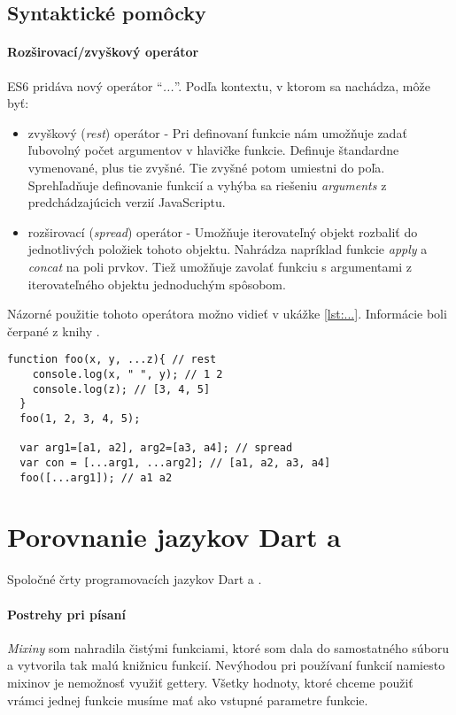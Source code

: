 \subsection{Syntaktické pomôcky}

\paragraph{Rozširovací/zvyškový operátor}
ES6 pridáva nový operátor ``\emph{...}''. Podľa kontextu, v ktorom sa nachádza, môže byť:
\begin{itemize}
  \item zvyškový (\emph{rest}) operátor - Pri definovaní funkcie nám umožňuje zadať ľubovolný počet argumentov v hlavičke funkcie. Definuje štandardne vymenované, plus tie zvyšné. Tie zvyšné potom umiestni do poľa. Sprehľadňuje definovanie funkcií a vyhýba sa riešeniu \emph{arguments} z predchádzajúcich verzií JavaScriptu.
  \item rozširovací (\emph{spread}) operátor - Umožňuje iterovateľný objekt rozbaliť do jednotlivých položiek tohoto objektu. Nahrádza napríklad funkcie \emph{apply} a \emph{concat} na poli prvkov. Tiež umožňuje zavolať funkciu s argumentami z iterovateľného objektu jednoduchým spôsobom.
\end{itemize}
Názorné použitie tohoto operátora možno vidieť v ukážke \ref{lst:...}.
Informácie boli čerpané z knihy \cite[Exploring ES6]{expES6}.

\begin{lstlisting}[caption=rozširovací/zvyškový operátor, label={lst:...}]
  function foo(x, y, ...z){ // rest
    console.log(x, " ", y); // 1 2
    console.log(z); // [3, 4, 5]
  }
  foo(1, 2, 3, 4, 5);

  var arg1=[a1, a2], arg2=[a3, a4]; // spread
  var con = [...arg1, ...arg2]; // [a1, a2, a3, a4]
  foo([...arg1]); // a1 a2
\end{lstlisting}








\section{Porovnanie jazykov Dart a \JS{}}
Spoločné črty programovacích jazykov Dart a \JS{}. \TODO

\paragraph{Postrehy pri písaní}
\emph{Mixiny} som nahradila čistými funkciami, ktoré som dala do samostatného súboru a vytvorila tak malú knižnicu funkcií.
Nevýhodou pri používaní funkcií namiesto mixinov je nemožnosť využiť gettery. Všetky hodnoty, ktoré chceme použiť vrámci jednej funkcie musíme mať ako vstupné parametre funkcie.


